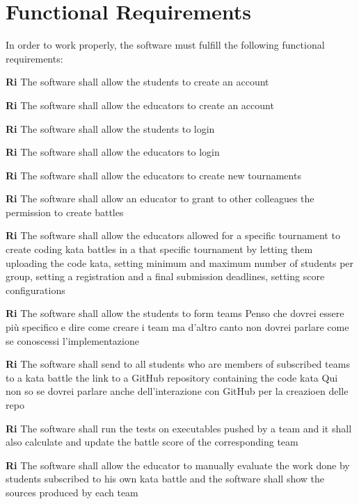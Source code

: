 {\color{red} \section{Functional Requirements}}
In order to work properly, the software must fulfill the following functional requirements:
    \begin{requirements}
        \item \textbf{Ri} \quad The software shall allow the students to create an account
        \item \textbf{Ri} \quad The software shall allow the educators to create an account 
        \item \textbf{Ri} \quad The software shall allow the students to login
        \item \textbf{Ri} \quad The software shall allow the educators to login
        \item \textbf{Ri} \quad The software shall allow the educators to create new tournaments
        \item \textbf{Ri} \quad The software shall allow an educator to grant to other colleagues the permission to create battles
        \item \textbf{Ri} \quad The software shall allow the educators allowed for a specific tournament to create coding kata battles in a that specific tournament by letting them uploading the code kata, setting minimum and maximum number of students per group, setting a registration and a final submission deadlines, setting score configurations
        \item \textbf{Ri} \quad The software shall allow the students to form teams {\color{red} Penso che dovrei essere più specifico e dire come creare i team ma d'altro canto non dovrei parlare come se conoscessi l'implementazione}
        \item \textbf{Ri} \quad The software shall send to all students who are members of subscribed teams to a kata battle the link to a GitHub repository containing the code kata {\color{red} Qui non so se dovrei parlare anche dell'interazione con GitHub per la creazioen delle repo}
        \item \textbf{Ri} \quad The software shall run the tests on executables pushed by a team and it shall also calculate and update the battle score of the corresponding team 
        \item \textbf{Ri} \quad The software shall allow the educator to manually evaluate the work done by students subscribed to his own kata battle and the software shall show the sources produced by each team

\end{requirements}
